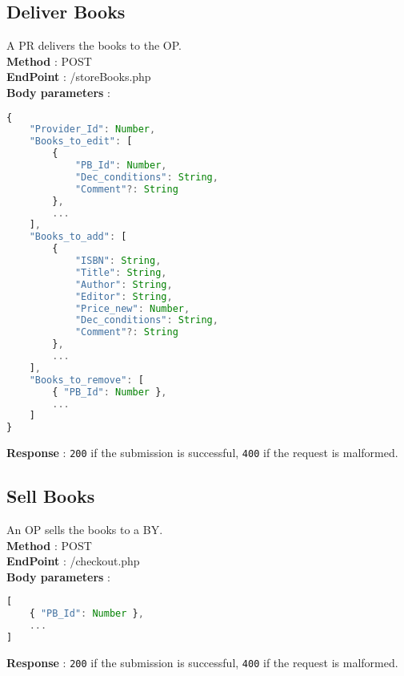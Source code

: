 \subsection{Deliver Books}
A PR delivers the books to the OP.\\
\textbf{Method} : POST \\
\textbf{EndPoint} : /storeBooks.php \\
\textbf{Body parameters} :
\begin{lstlisting}[language=JavaScript, label={lst:jscode}, basicstyle=\ttfamily]
{
    "Provider_Id": Number,
    "Books_to_edit": [
        {
            "PB_Id": Number,
            "Dec_conditions": String,
            "Comment"?: String
        },
        ...
    ],
    "Books_to_add": [
        {
            "ISBN": String,
            "Title": String,
            "Author": String,
            "Editor": String,
            "Price_new": Number,
            "Dec_conditions": String,
            "Comment"?: String
        },
        ...
    ],
    "Books_to_remove": [
        { "PB_Id": Number },
        ...
    ]
}
\end{lstlisting}
\textbf{Response} : \texttt{200} if the submission is successful, \texttt{400} if the request is malformed.

\subsection{Sell Books}
An OP sells the books to a BY.\\
\textbf{Method} : POST \\
\textbf{EndPoint} : /checkout.php \\
\textbf{Body parameters} :
\begin{lstlisting}[language=JavaScript, label={lst:jscode}, basicstyle=\ttfamily]
[
    { "PB_Id": Number },
    ...
]
\end{lstlisting}
\textbf{Response} : \texttt{200} if the submission is successful, \texttt{400} if the request is malformed.

